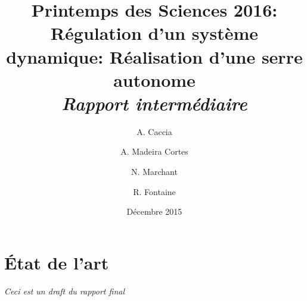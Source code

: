 \documentclass[a4paper,10pt]{report}
\title{Printemps des Sciences 2016: \\Régulation d'un système dynamique: Réalisation d'une serre autonome\\\textit{Rapport intermédiaire}}
\author{A. Caccia \and A. Madeira Cortes \and N. Marchant \and R. Fontaine}
\date{Décembre 2015}
\begin{document}
\maketitle

\chapter{État de l'art}
\textit{Ceci est un draft du rapport final}\\







\printbibliography
\end{document}
